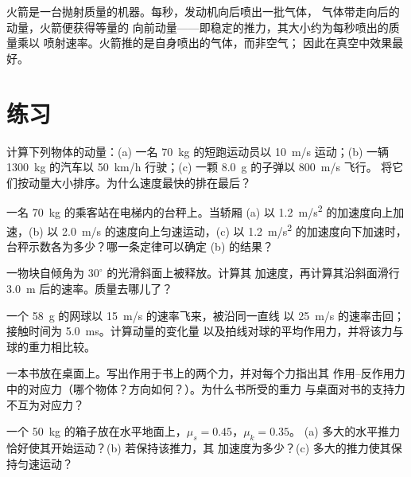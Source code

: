 \begin{remark}[火箭如何不借助外物推进]\label{rem:g12:newtons-laws:rocket}
火箭是一台抛射质量的机器。每秒，发动机向后喷出一批气体，
气体带走向后的动量，火箭便获得等量的
向前动量——即稳定的推力，其大小约为每秒喷出的质量乘以
喷射速率。火箭推的是自身喷出的气体，而非空气；
因此在真空中效果最好。
\end{remark}

\section{练习}

\begin{exercise}[$\star$]\label{exo:g12:newtons-laws:1}
计算下列物体的动量：(a) 一名 \qty{70}{kg} 的短跑运动员以 \qty{10}{m/s} 运动；(b)
一辆 \qty{1300}{kg} 的汽车以 \qty{50}{km/h} 行驶；(c) 一颗 \qty{8.0}{g} 的子弹以 \qty{800}{m/s} 飞行。
将它们按动量大小排序。为什么速度最快的排在最后？
\end{exercise}

\begin{exercise}[$\star$]\label{exo:g12:newtons-laws:2}
一名 \qty{70}{kg} 的乘客站在电梯内的台秤上。当轿厢
(a) 以 \qty{1.2}{m/s^2} 的加速度向上加速，(b) 以 \qty{2.0}{m/s}
的速度向上匀速运动，(c) 以 \qty{1.2}{m/s^2} 的加速度向下加速时，台秤示数各为多少？哪一条定律可以确定 (b) 的结果？
\end{exercise}

\begin{exercise}[$\star$]\label{exo:g12:newtons-laws:3}
一物块自倾角为 $30^\circ$ 的光滑斜面上被释放。计算其
加速度，再计算其沿斜面滑行 \qty{3.0}{m} 后的速率。质量去哪儿了？
\end{exercise}

\begin{exercise}[$\star$]\label{exo:g12:newtons-laws:4}
一个 \qty{58}{g} 的网球以 \qty{15}{m/s} 的速率飞来，被沿同一直线
以 \qty{25}{m/s} 的速率击回；接触时间为 \qty{5.0}{ms}。计算动量的变化量
以及拍线对球的平均作用力，并将该力与球的重力相比较。
\end{exercise}

\begin{exercise}[$\star$]\label{exo:g12:newtons-laws:5}
一本书放在桌面上。写出作用于书上的两个力，并对每个力指出其
作用–反作用力中的对应力（哪个物体？方向如何？）。为什么书所受的重力
与桌面对书的支持力不互为对应力？
\end{exercise}

\begin{exercise}[$\star\star$]\label{exo:g12:newtons-laws:6}
一个 \qty{50}{kg} 的箱子放在水平地面上，$\mu_s = 0.45$，$\mu_k = 0.35$。
(a) 多大的水平推力恰好使其开始运动？(b) 若保持该推力，其
加速度为多少？(c) 多大的推力使其保持匀速运动？
\end{exercise}

